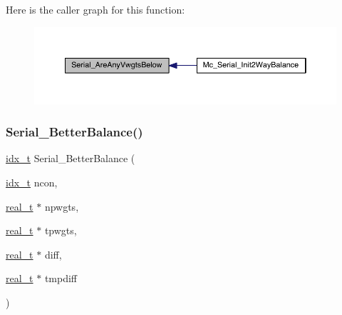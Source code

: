 Here is the caller graph for this function\+:\nopagebreak
\begin{figure}[H]
\begin{center}
\leavevmode
\includegraphics[width=350pt]{a00407_ad0ed41db7a15698760c73a84b9eb64fc_icgraph}
\end{center}
\end{figure}
\mbox{\label{a00407_a62ce727c3eee17b8d8add92ffeb8adbe}} 
\subsubsection{\texorpdfstring{Serial\+\_\+\+Better\+Balance()}{Serial\_BetterBalance()}}
{\footnotesize\ttfamily \hyperlink{a00876_aaa5262be3e700770163401acb0150f52}{idx\+\_\+t} Serial\+\_\+\+Better\+Balance (\begin{DoxyParamCaption}\item[{\hyperlink{a00876_aaa5262be3e700770163401acb0150f52}{idx\+\_\+t}}]{ncon,  }\item[{\hyperlink{a00876_a1924a4f6907cc3833213aba1f07fcbe9}{real\+\_\+t} $\ast$}]{npwgts,  }\item[{\hyperlink{a00876_a1924a4f6907cc3833213aba1f07fcbe9}{real\+\_\+t} $\ast$}]{tpwgts,  }\item[{\hyperlink{a00876_a1924a4f6907cc3833213aba1f07fcbe9}{real\+\_\+t} $\ast$}]{diff,  }\item[{\hyperlink{a00876_a1924a4f6907cc3833213aba1f07fcbe9}{real\+\_\+t} $\ast$}]{tmpdiff }\end{DoxyParamCaption})}

